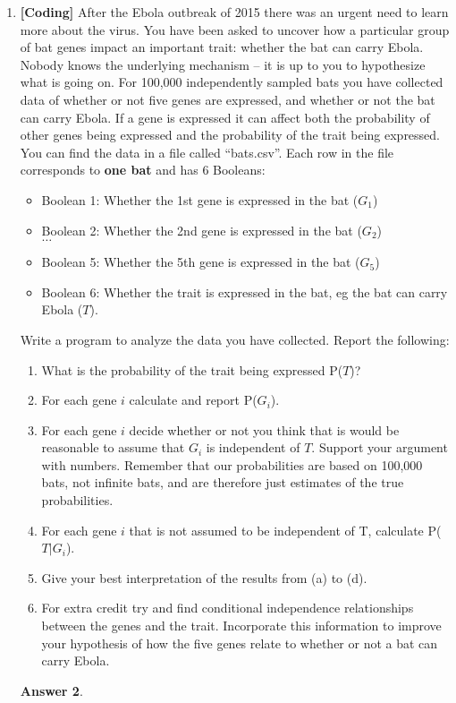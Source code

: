 \documentclass[12pt]{article}
\renewcommand{\(}{\left(}
\renewcommand{\)}{\right)}
\theoremstyle{definition}
\newtheorem*{answer}{Answer}
\begin{document}
\begin{enumerate}
    \begin{shaded}
    \begin{answer}
    
    \end{answer}
    \end{shaded}
    \pagebreak
    \item \textbf{[Coding]} After the Ebola outbreak of 2015 there was an urgent need to learn more about the virus. You have been asked to uncover how a particular group of bat genes impact an important trait: whether the bat can carry Ebola. Nobody knows the underlying mechanism -- it is up to you to hypothesize what is going on. For 100,000 independently sampled bats you have collected data of whether or not five genes are expressed, and whether or not the bat can carry Ebola. If a gene is expressed it can affect both the probability of other genes being expressed and the probability of the trait being expressed. You can find the data in a file called ``bats.csv''. Each row in the file corresponds to \textbf{one bat} and has 6 Booleans:
    \begin{itemize}
        \item Boolean 1: Whether the 1st gene is expressed in the bat ($G_1$)
        \item Boolean 2: Whether the 2nd gene is expressed in the bat ($G_2$)\\ $\dots$
        \item Boolean 5: Whether the 5th gene is expressed in the bat ($G_5$)
        \item Boolean 6: Whether the trait is expressed in the bat, eg the bat can carry Ebola ($T$).
    \end{itemize}
    Write a program to analyze the data you have collected. Report the following:
    \begin{enumerate}
        \item What is the probability of the trait being expressed P($T$)?
        \item For each gene $i$ calculate and report P($G_i$).
        \item For each gene $i$ decide whether or not you think that is would be reasonable to assume that $G_i$ is independent of $T$. Support your argument with numbers. Remember that our probabilities are based on 100,000 bats, not infinite bats, and are therefore just estimates of the true probabilities.
        \item For each gene $i$ that is not assumed to be independent of T, calculate P($T | G_i$).
        \item Give your best interpretation of the results from (a) to (d).
        \item For extra credit try and find conditional independence relationships between the genes and the trait. Incorporate this information to improve your hypothesis of how the five genes relate to whether or not a bat can carry Ebola.
    \end{enumerate}
    
    \begin{shaded}
    \begin{answer}
    
    \end{answer}
    \end{shaded}
    
\end{enumerate}
\end{document}
